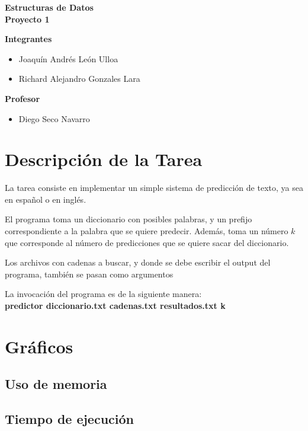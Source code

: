 \documentclass{report}
\begin{document}
    \begin{titlepage}
        \vspace*{5cm}
        \begin{center}
            \Huge{\textbf{Estructuras de Datos \\ Proyecto 1}}
        \end{center}
        \vspace*{2cm}
        \begin{center}
            \textbf{Integrantes}
            \begin{itemize}
                \item Joaquín Andrés León Ulloa
                \item Richard Alejandro Gonzales Lara
            \end{itemize}
            \vspace*{5mm}
            \textbf{Profesor}
            \begin{itemize}
                \item Diego Seco Navarro
            \end{itemize}
        \end{center}
    \end{titlepage}
    \section*{Descripción de la Tarea}
        \justify
        La tarea consiste en implementar un simple
        sistema de predicción de texto, ya sea en
        español o en inglés.
        
        \justify
        El programa toma un diccionario con posibles
        palabras, y un prefijo correspondiente a la
        palabra que se quiere predecir. Además, toma
        un número $k$ que corresponde al número de
        predicciones que se quiere sacar del diccionario.
        
        \justify
        Los archivos con cadenas a buscar, y donde se
        debe escribir el output del programa, también
        se pasan como argumentos
        
        \begin{center}
            La invocación del programa es de la
            siguiente manera:\\
            
            \textbf{predictor diccionario.txt
            cadenas.txt resultados.txt k}
        \end{center}
        
        \section*{Gráficos}
            \subsection*{Uso de memoria}
            \subsection*{Tiempo de ejecución}
\end{document}
